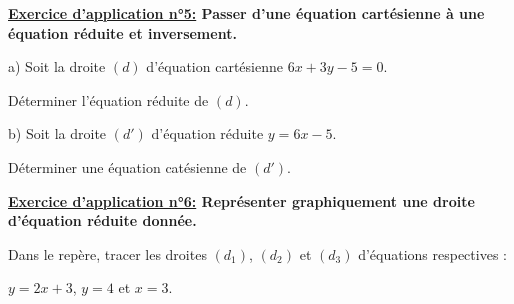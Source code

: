\documentclass[12pt]{article}
\begin{document}
\begin{mdframed}[
    linewidth=1pt,
    roundcorner=5pt,
    linecolor=RoyalBlue,
    innertopmargin=10pt,
    innerbottommargin=10pt
]
{\color{RoyalBlue}
\textbf{\underline{Exercice d'application n°5:} Passer d'une équation cartésienne à une équation réduite 
et inversement.}}

\vspace{5pt}
\hspace{1cm}a) Soit la droite $(d)$ d’équation cartésienne $6x + 3y - 5 = 0$. 

\hspace{1.5cm}Déterminer l’équation réduite de $(d)$.

\vspace{5pt}
\hspace{1cm}b) Soit la droite $(d')$ d’équation réduite $y = 6x - 5$.

\hspace{1.5cm}Déterminer une équation catésienne de $(d')$.

\vspace{0.5cm}
{\color{black!30}\dotfill}

\vspace{0.5cm}
{\color{black!30}\dotfill}

\vspace{0.5cm}
{\color{black!30}\dotfill}

\vspace{0.5cm}
{\color{black!30}\dotfill}

\vspace{20pt}

{\color{RoyalBlue}
\textbf{\underline{Exercice d'application n°6:} Représenter graphiquement une droite d’équation réduite 
donnée.}}

\vspace{5pt}
\begin{minipage}[t]{.45\textwidth}%
    \vspace{0pt}
    Dans le repère, tracer les droites $(d_1)$, $(d_2)$ et $(d_3)$ d’équations respectives :

    $y = 2x + 3$, $y = 4$ et $x = 3$.

    \vspace{0.5cm}
    {\color{black!30}\dotfill}
    
    \vspace{0.5cm}
    {\color{black!30}\dotfill}
    
    \vspace{0.5cm}
    {\color{black!30}\dotfill}
    

\end{minipage}
\end{mdframed}
\end{document}
